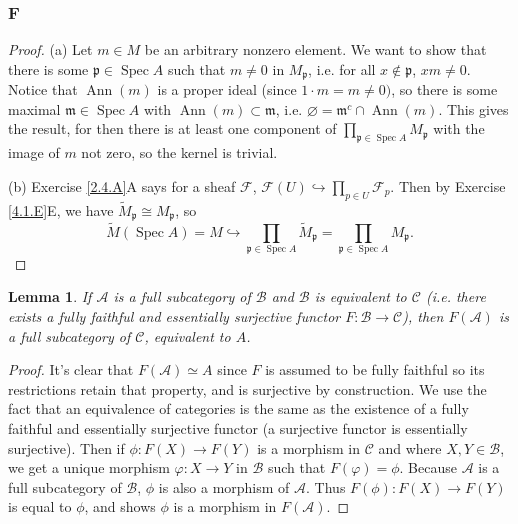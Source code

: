 \documentclass{article}
\newcommand{\fA}{\mathscr{A}}
\newcommand{\fB}{\mathscr{B}}
\newcommand{\fC}{\mathscr{C}}
\newcommand{\fF}{\mathscr{F}}
\newcommand{\frkm}{\mathfrak{m}}
\newcommand{\frkp}{\mathfrak{p}}
\DeclareMathOperator{\Ann}{\mathrm{Ann}}
\DeclareMathOperator{\Spec}{\mathrm{Spec}}
\let\emptyset\varnothing
\newtheorem{lemma}[theorem]{Lemma}
\begin{document}
\subsubsection{F}\label{4.1.F}
\begin{proof}
    \noindent(a) Let $m\in M$ be an arbitrary nonzero element. We want to show that there is some $\frkp \in \Spec A$ such that $m\ne 0$ in $M_\frkp$, i.e. for all $x\notin \frkp$, $xm \ne 0$. Notice that $\Ann(m)$ is a proper ideal (since $1\cdot m=m \ne 0)$, so there is some maximal $\frkm \in \Spec A$ with $\Ann(m)\subset \frkm$, i.e. $\emptyset = \frkm^c \cap \Ann(m)$. This gives the result, for then there is at least one component of $\prod_{\frkp \in \Spec A} M_\frkp$ with the image of $m$ not zero, so the kernel is trivial.

    \noindent (b) Exercise \ref{2.4.A}A
    says for a sheaf $\fF$, $\fF(U) \hookrightarrow \prod_{p \in U} \fF_p$. Then by Exercise \ref{4.1.E}E, we have $\widetilde M_\frkp \cong M_\frkp$, so 
    \[
    \widetilde M(\Spec A) = M \hookrightarrow \prod_{\frkp \in \Spec A} \widetilde M_\frkp = \prod_{\frkp \in \Spec A} M_\frkp.
    \]
\end{proof}
\begin{lemma}\label{lem:equivalences preserve fullness}
        If $\fA$ is a full subcategory of $\fB$ and $\fB$ is equivalent to $\fC$ (i.e. there exists a fully faithful and essentially surjective functor $F:\fB\to \fC$), then $F(\fA)$ is a full subcategory of $\fC$, equivalent to $A$.
    \end{lemma}
    \begin{proof}
       It's clear that $F(\fA) \simeq A$ since $F$ is assumed to be fully faithful so its restrictions retain that property, and is surjective by construction. We use the fact that an equivalence of categories is the same as the existence of a fully faithful and essentially surjective functor (a surjective functor is essentially surjective). Then if $\phi: F(X)\to F(Y)$ is a morphism in $\fC$ and where $X,Y\in \fB$, we get a unique morphism $\varphi:X\to Y$ in $\fB$ such that $F(\varphi)=\phi$. Because $\fA$ is a full subcategory of $\fB$, $\phi$ is also a morphism of $\fA$. Thus $F(\phi):F(X)\to F(Y)$ is equal to $\phi$, and shows $\phi$ is a morphism in $F(\fA)$.
    \end{proof}
\end{document}
